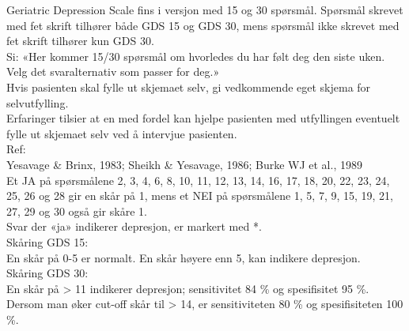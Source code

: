 \documentclass[pdf,  style=code128, globalid=OMRCRFv5.0.2, english, stamp, pagemark, oneside]{sdapsclassic}
\begin{document}
\begin{questionnaire}
\begin{tcolorbox}
\small
Geriatric Depression Scale fins i versjon med 15 og 30 spørsmål. Spørsmål skrevet med fet skrift tilhører både GDS 15 og GDS 30, mens spørsmål ikke skrevet med fet skrift tilhører kun GDS 30.\\[0.1em]
Si: «Her kommer 15/30 spørsmål om hvorledes du har følt deg den siste uken. Velg det svaralternativ som passer for deg.»\\[0.1em]

Hvis pasienten skal fylle ut skjemaet selv, gi vedkommende eget skjema for selvutfylling.\\
Erfaringer tilsier at en med fordel kan hjelpe pasienten med utfyllingen eventuelt fylle ut skjemaet selv ved å intervjue pasienten.\\[0.1em]

Ref:\\
Yesavage \& Brinx, 1983; Sheikh \& Yesavage, 1986; Burke WJ et al., 1989 \\[0.1em]

Et JA på spørsmålene 2, 3, 4, 6, 8, 10, 11, 12, 13, 14, 16, 17, 18, 20, 22, 23, 24, 25, 26 og 28 gir en skår på 1, mens et NEI på spørsmålene 1, 5, 7, 9, 15, 19, 21, 27, 29 og 30 også gir skåre 1.\\
Svar der «ja» indikerer depresjon, er markert med *.\\[0.1em]

Skåring GDS 15:\\
En skår på 0-5 er normalt. En skår høyere enn 5, kan indikere depresjon.\\
Skåring GDS 30:\\
En skår på > 11 indikerer depresjon; sensitivitet 84 \% og spesifisitet 95 \%. Dersom man øker cut-off skår til > 14, er sensitiviteten 80 \% og spesifisiteten 100 \%.
\normalsize
\end{tcolorbox}

\ExplSyntaxOn
\newcommand{\gdsrow}[3]{
    \sdaps_qobject_begin:nnn {gds_item} { Option } {#3}
    \sdaps_qobject_append_var:n {#3}
        \sdaps_checkbox_set_type:n {singlechoice}
        #1 & #2 &
    \sdaps_answer:n {#3} \sdaps_checkbox:nn {} {1}   &
        \sdaps_answer:n {#3} \sdaps_checkbox:nn {} {0}

    \sdaps_qobject_end:n {gds_item}
}
\ExplSyntaxOff


\end{questionnaire}
\end{document}
